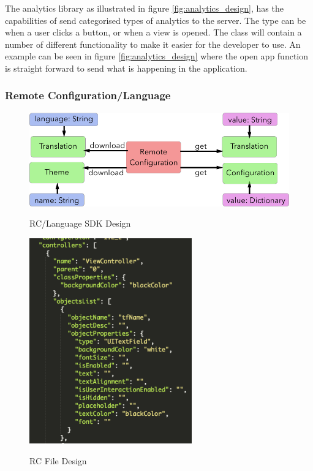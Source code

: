 The analytics library as illustrated in figure \ref{fig:analytics_design}, has the capabilities of send categorised types of analytics to the server. The type can be when a user clicks a button, or when a view is opened. The class will contain a number of different functionality to make it easier for the developer to use. An example can be seen in figure \ref{fig:analytics_design} where the open app function is straight forward to send what is happening in the application.

\subsubsection{Remote Configuration/Language}

\begin{figure}[!h]
    \caption{RC/Language SDK Design}
    \centering
    \includegraphics[width=120mm]{images/design/remote_config}
    \label{fig:remote_config_design}
\end{figure}


\begin{figure}[!h]
    \caption{RC File Design}
    \centering
    \includegraphics[width=70mm]{images/design/rc_file}
    \label{fig:rc_file_design}
\end{figure}

